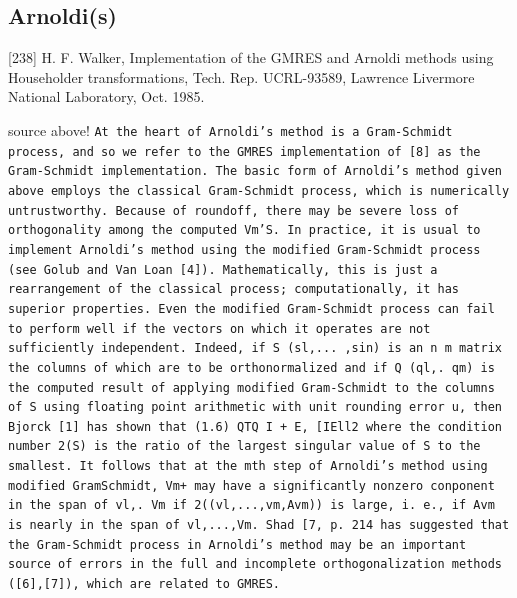 \documentclass{scrartcl}
\begin{document}
\subsection{Arnoldi(s)}

[238] H. F. Walker, Implementation of the GMRES and Arnoldi methods using Householder transformations, Tech. Rep. UCRL-93589, Lawrence Livermore National Laboratory, Oct. 1985.

source above! \texttt{At the heart of Arnoldi’s method is a Gram-Schmidt process, and so we refer to the
GMRES implementation of [8] as the Gram-Schmidt implementation. The basic form
of Arnoldi’s method given above employs the classical Gram-Schmidt process, which
is numerically untrustworthy. Because of roundoff, there may be severe loss of orthogonality among the computed Vm’S. In practice, it is usual to implement Arnoldi’s
method using the modified Gram-Schmidt process (see Golub and Van Loan [4]).
Mathematically, this is just a rearrangement of the classical process; computationally, it has superior properties.
Even the modified Gram-Schmidt process can fail to perform well if the vectors on which it operates are not sufficiently independent. Indeed, if S (sl,... ,sin) is an n m matrix the columns of which are to be orthonormalized and if Q (ql,. qm) is the computed result of applying modified Gram-Schmidt to the columns of S using floating point arithmetic with unit rounding error u, then Bjorck [1] has shown that (1.6) QTQ I + E, [IEll2 where the condition number 2(S) is the ratio of the largest singular value of S to the smallest. It follows that at the mth step of Arnoldi’s method using modified GramSchmidt, Vm+ may have a significantly nonzero conponent in the span of {vl,. Vm}
if 2((vl,...,vm,Avm)) is large, i. e., if Avm is nearly in the span of {vl,...,Vm}.
Shad [7, p. 214 has suggested that the Gram-Schmidt process in Arnoldi’s method may be an important source of errors in the full and incomplete orthogonalization
methods ([6],[7]), which are related to GMRES.
}
\end{document}
